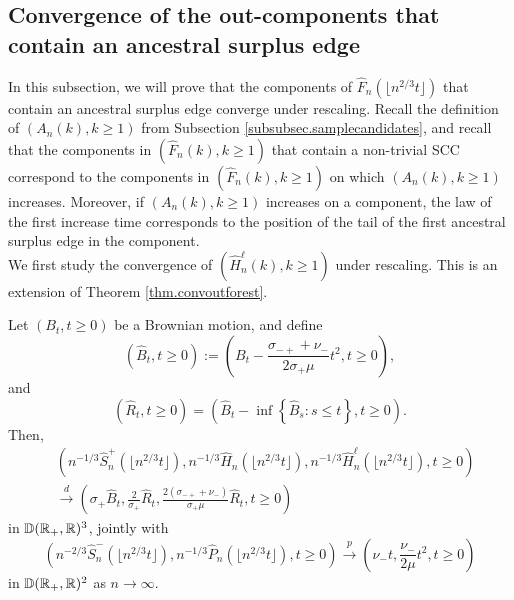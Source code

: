 \subsection{Convergence of the out-components that contain an ancestral surplus edge}\label{subsec.ancestral}
In this subsection, we will prove that the components of $\hat{F}_n\left(\lfloor n^{2/3}t\rfloor\right)$ that contain an ancestral surplus edge converge under rescaling. Recall the definition of $(A_n(k),k\geq 1)$ from Subsection \ref{subsubsec.samplecandidates}, and recall that the components in $(\hat{F}_n(k),k\geq 1)$ that contain a non-trivial SCC correspond to the components in $(\hat{F}_n(k),k\geq 1)$ on which $(A_n(k),k\geq 1)$ increases. Moreover, if $(A_n(k),k\geq 1)$ increases on a component, the law of the first increase time corresponds to the position of the tail of the first ancestral surplus edge in the component. \\
We first study the convergence of $(\hat{H}_n^\ell(k),k\geq 1)$ under rescaling. This is an extension of Theorem \ref{thm.convoutforest}.
\begin{lemma}\label{lemma.heightprocesswithlengths}
Let $(B_t, t\geq 0)$ be a Brownian motion, and define
$$(\hat{B}_t,t\geq 0):=\left( B_t-\frac{\sigma_{-+}+\nu_-}{2\sigma_+ \mu}t^2, t\geq 0\right),$$ and $$(\hat{R}_t,t\geq 0)=\left(\hat{B}_t-\inf\left\{\hat{B}_s: s\leq t\right\},t\geq 0\right).$$ 
Then,
\begin{align*}&\left(n^{-1/3}\hat{S}^{+}_n\left(\lfloor n^{2/3}t\rfloor \right),n^{-1/3}\hat{H}_{n}\left(\lfloor n^{2/3}t\rfloor \right),n^{-1/3}\hat{H}^\ell_{n}\left(\lfloor n^{2/3}t\rfloor \right),  t\geq 0\right)\\
&\overset{d}{\to}\left(\sigma_+ \hat{B}_t, \frac{2}{\sigma_+} \hat{R}_t,\frac{2(\sigma_{-+}+\nu_-)}{\sigma_+\mu} \hat{R}_t, t\geq 0\right)\end{align*}
in ${\mathbb D}({\mathbb R}_+,{\mathbb R})^3$,
jointly with 
$$\left(n^{-2/3}\hat{S}_n^-\left(\lfloor n^{2/3}t\rfloor \right), n^{-1/3}\hat{P}_n\left(\lfloor n^{2/3}t\rfloor \right),t\geq 0\right)\overset{p}{\to}\left(\nu_-t,  \frac{\nu_-}{2\mu} t^2, t\geq 0\right)$$
in ${\mathbb D}({\mathbb R}_+,{\mathbb R})^2$ as $n\to \infty$.
\end{lemma}
